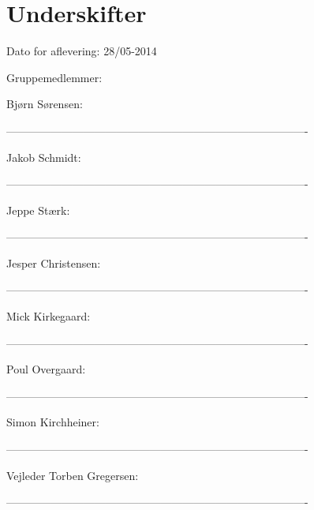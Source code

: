 \chapter{Underskifter}

Dato for aflevering: 28/05-2014

Gruppemedlemmer:

Bjørn Sørensen:


----------------------------------------------------------------------------------

Jakob Schmidt:


----------------------------------------------------------------------------------

Jeppe Stærk:


----------------------------------------------------------------------------------

Jesper Christensen:


----------------------------------------------------------------------------------

Mick Kirkegaard:


----------------------------------------------------------------------------------

Poul Overgaard:


----------------------------------------------------------------------------------

Simon Kirchheiner:


----------------------------------------------------------------------------------







Vejleder Torben Gregersen:


----------------------------------------------------------------------------------